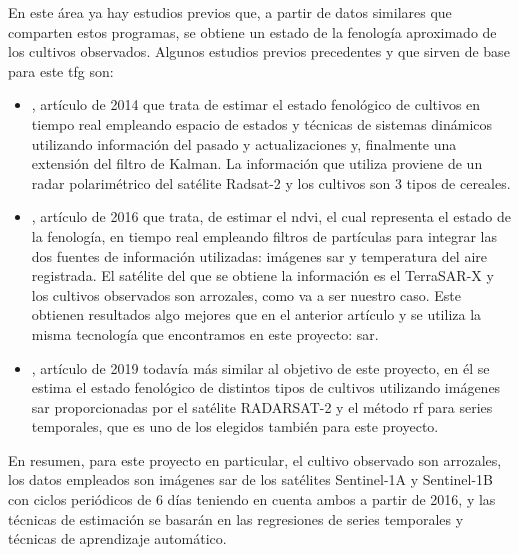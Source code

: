 \par En este área ya hay estudios previos que, a partir de datos similares que comparten estos programas, se obtiene un estado de la fenología aproximado de los cultivos observados. Algunos estudios previos precedentes y que sirven de base para este \gls{tfg} son:
\\
\begin{itemize}
    \item \cite{Juanma2014}, artículo de 2014 que trata de estimar el estado fenológico de cultivos en tiempo real empleando espacio de estados y técnicas de sistemas dinámicos utilizando información del pasado y actualizaciones y, finalmente una extensión del filtro de Kalman. La información que utiliza proviene de un radar polarimétrico del satélite Radsat-2 y los cultivos son 3 tipos de cereales. 
    \\
    \item \cite{Juanma2016}, artículo de 2016 que trata, de estimar el \gls{ndvi}, el cual representa el estado de la fenología, en tiempo real empleando filtros de partículas para integrar las dos fuentes de información utilizadas: imágenes \gls{sar} y temperatura del aire registrada. El satélite del que se obtiene la información es el TerraSAR-X y los cultivos observados son arrozales, como va a ser nuestro caso. Este obtienen resultados algo mejores que en el anterior artículo y se utiliza la misma tecnología que encontramos en este proyecto: \gls{sar}. 
    \\
    \item \cite{artRF}, artículo de 2019 todavía más similar al objetivo de este proyecto, en él se estima el estado fenológico de distintos tipos de cultivos utilizando imágenes \gls{sar} proporcionadas por el satélite RADARSAT-2 y el método \gls{rf} para series temporales, que es uno de los elegidos también para este proyecto. 
\end{itemize} 

\par En resumen, para este proyecto en particular, el cultivo observado son arrozales, los datos empleados son imágenes \gls{sar} de los satélites Sentinel-1A y Sentinel-1B con ciclos periódicos de 6 días teniendo en cuenta ambos a partir de 2016, y las técnicas de estimación se basarán en las regresiones de series temporales y técnicas de aprendizaje automático. 
\\

